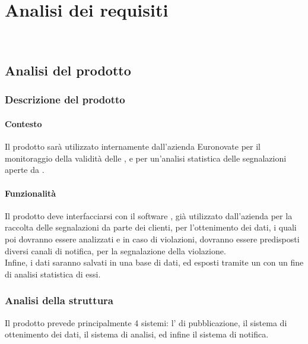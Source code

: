 
\chapter{Analisi dei requisiti}
\label{cap:analisi-requisiti}

\\
\section{Analisi del prodotto}
	\subsection{Descrizione del prodotto}
		\subsubsection{Contesto}
			Il prodotto sarà utilizzato internamente dall'azienda Euronovate per il monitoraggio della validità delle , e per un'analisi statistica delle segnalazioni aperte da .
		\subsubsection{Funzionalità} 
			Il prodotto deve interfacciarsi con il software , già utilizzato dall'azienda per la raccolta delle segnalazioni da parte dei clienti, per l'ottenimento dei dati, i quali poi dovranno essere analizzati e in caso di violazioni, dovranno essere predisposti diversi canali di notifica, per la segnalazione della violazione.\\
			Infine, i dati saranno salvati in una base di dati, ed esposti tramite un  con un fine di analisi statistica di essi.
		\subsection{Analisi della struttura} 
			Il prodotto prevede principalmente 4 sistemi: l' di pubblicazione, il sistema di ottenimento dei dati, il sistema di analisi, ed infine il sistema di notifica.

